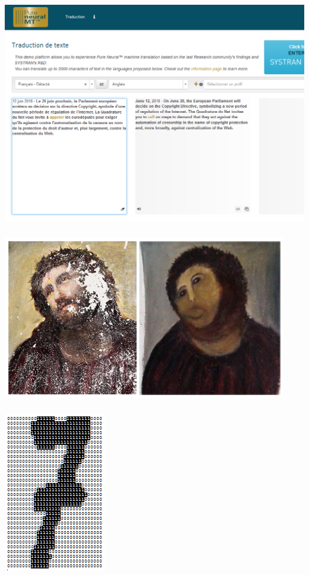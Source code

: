 \documentclass[11pt]{beamer}
\newenvironment{slide}[1]{%
\begin{frame}[environment=slide]
\frametitle{#1}
}{%
\end{frame}
}
\begin{document}
\begin{slide}{}

\includegraphics[scale=0.3]{A3tnl}

\end{slide}

\begin{slide}{}

\includegraphics[scale=0.5]{A4facerecognition}

\end{slide}

\begin{slide}{}

\includegraphics[scale=0.75]{A5imagerecognition}

\end{slide}
\end{document}
